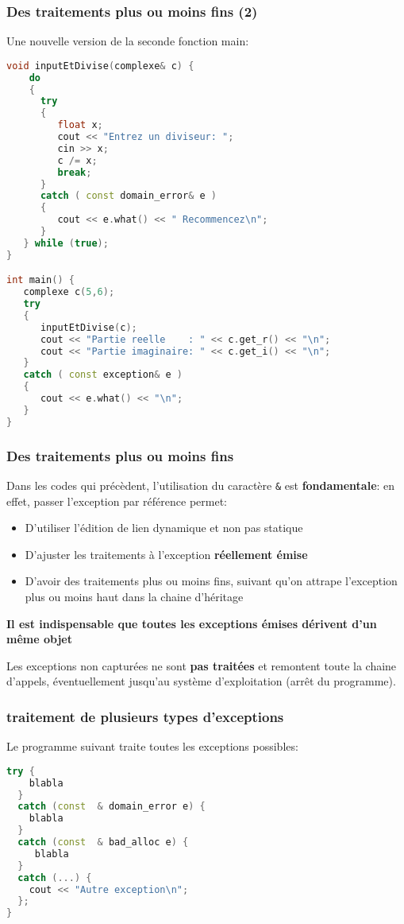 \documentclass{beamer}
\begin{document}
\begin{frame}[fragile=singleslide,shrink=20]
\frametitle {Des traitements plus ou moins fins (2)}

Une nouvelle version de la seconde fonction main:
\begin{lstlisting}[language=c++]
void inputEtDivise(complexe& c) {
	do
	{
      try
      {
         float x;
         cout << "Entrez un diviseur: ";
         cin >> x;
         c /= x;
         break;
      }
      catch ( const domain_error& e )
      {
         cout << e.what() << " Recommencez\n";
      }
   } while (true);
}

int main() {
   complexe c(5,6);
   try
   {
      inputEtDivise(c);
      cout << "Partie reelle    : " << c.get_r() << "\n";
      cout << "Partie imaginaire: " << c.get_i() << "\n";
   }
   catch ( const exception& e )
   {
      cout << e.what() << "\n";
   }
}
\end{lstlisting}
\end{frame}

\begin{frame}[fragile=singleslide,shrink=20]
\frametitle {Des traitements plus ou moins fins}

Dans les codes qui précèdent, l'utilisation du caractère \texttt{\&} est \textbf{fondamentale}: en effet, passer l'exception par 
référence permet:

\begin{itemize}
\item{D'utiliser l'édition de lien dynamique et non pas statique}
\item{D'ajuster les traitements à l'exception \textbf{réellement émise}}
\item{D'avoir des traitements plus ou moins fins, suivant qu'on attrape l'exception plus ou moins haut dans la 
chaine d'héritage}
\end{itemize}

\textbf{Il est indispensable que toutes les exceptions émises dérivent d'un même objet}

Les exceptions non capturées ne sont \textbf{pas traitées} et remontent toute la chaine d'appels, 
éventuellement jusqu'au système d'exploitation (arrêt du programme).

\end{frame}

\begin{frame}[fragile=singleslide,shrink=20]
\frametitle {traitement de plusieurs types d'exceptions}

Le programme suivant traite toutes les exceptions possibles:
\begin{lstlisting}[language=c++]
try {
    blabla
  }
  catch (const  & domain_error e) {
    blabla
  }
  catch (const  & bad_alloc e) {
     blabla
  }  
  catch (...) {
    cout << "Autre exception\n";
  };
} 
\end{lstlisting}
\end{frame}
\end{document}
